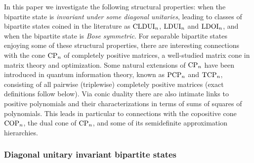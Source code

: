 \documentclass[11pt]{article}
\newcommand{\PCP}{\text{\rm PCP}}
\newcommand{\TCP}{\text{\rm TCP}}
\newcommand{\CP}{\text{\rm CP}}
\newcommand{\COP}{\text{\rm COP}}
\newcommand{\CLDUI}{\text{\rm CLDUI}}
\newcommand{\LDUI}{\text{\rm LDUI}}
\newcommand{\LDOI}{\text{\rm LDOI}}
\theoremstyle{plain}
\begin{document}
In this paper we investigate the following structural properties: when the bipartite state is {\em invariant under some diagonal unitaries}, leading to classes of bipartite states coined in the literature as $\CLDUI_n$, $\LDUI_n$  and $\LDOI_n$, and when the bipartite state is {\em Bose symmetric}. 
For separable bipartite states enjoying some of these structural properties, there are interesting connections  with the cone $\CP_n$ of completely positive matrices,  a well-studied matrix cone in matrix theory and optimization.  %
Some natural extensions of $\CP_n$ have been introduced in quantum information theory, known as $\PCP_n$ and $\TCP_n$, consisting of all pairwise (triplewise) completely positive matrices (exact definitions follow below). %
Via conic duality there are also intimate links to positive polynomials and their characterizations in terms of sums of squares of polynomials.
This leads in particular to connections with the copositive cone $\COP_n$, the dual cone of $\CP_n$, and some of its semidefinite approximation hierarchies.

\subsubsection*{Diagonal unitary invariant bipartite  states }\label{sec:intro-PCP}
\end{document}
